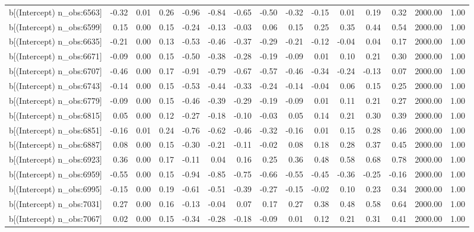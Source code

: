 \begin{table}[ht]
\begin{tabular}{rrrrrrrrrrrrrrr}
  b[(Intercept) n\_obs:6563] & -0.32 & 0.01 & 0.26 & -0.96 & -0.84 & -0.65 & -0.50 & -0.32 & -0.15 & 0.01 & 0.19 & 0.32 & 2000.00 & 1.00 \\ 
  b[(Intercept) n\_obs:6599] & 0.15 & 0.00 & 0.15 & -0.24 & -0.13 & -0.03 & 0.06 & 0.15 & 0.25 & 0.35 & 0.44 & 0.54 & 2000.00 & 1.00 \\ 
  b[(Intercept) n\_obs:6635] & -0.21 & 0.00 & 0.13 & -0.53 & -0.46 & -0.37 & -0.29 & -0.21 & -0.12 & -0.04 & 0.04 & 0.17 & 2000.00 & 1.00 \\ 
  b[(Intercept) n\_obs:6671] & -0.09 & 0.00 & 0.15 & -0.50 & -0.38 & -0.28 & -0.19 & -0.09 & 0.01 & 0.10 & 0.21 & 0.30 & 2000.00 & 1.00 \\ 
  b[(Intercept) n\_obs:6707] & -0.46 & 0.00 & 0.17 & -0.91 & -0.79 & -0.67 & -0.57 & -0.46 & -0.34 & -0.24 & -0.13 & 0.07 & 2000.00 & 1.00 \\ 
  b[(Intercept) n\_obs:6743] & -0.14 & 0.00 & 0.15 & -0.53 & -0.44 & -0.33 & -0.24 & -0.14 & -0.04 & 0.06 & 0.15 & 0.25 & 2000.00 & 1.00 \\ 
  b[(Intercept) n\_obs:6779] & -0.09 & 0.00 & 0.15 & -0.46 & -0.39 & -0.29 & -0.19 & -0.09 & 0.01 & 0.11 & 0.21 & 0.27 & 2000.00 & 1.00 \\ 
  b[(Intercept) n\_obs:6815] & 0.05 & 0.00 & 0.12 & -0.27 & -0.18 & -0.10 & -0.03 & 0.05 & 0.14 & 0.21 & 0.30 & 0.39 & 2000.00 & 1.00 \\ 
  b[(Intercept) n\_obs:6851] & -0.16 & 0.01 & 0.24 & -0.76 & -0.62 & -0.46 & -0.32 & -0.16 & 0.01 & 0.15 & 0.28 & 0.46 & 2000.00 & 1.00 \\ 
  b[(Intercept) n\_obs:6887] & 0.08 & 0.00 & 0.15 & -0.30 & -0.21 & -0.11 & -0.02 & 0.08 & 0.18 & 0.28 & 0.37 & 0.45 & 2000.00 & 1.00 \\ 
  b[(Intercept) n\_obs:6923] & 0.36 & 0.00 & 0.17 & -0.11 & 0.04 & 0.16 & 0.25 & 0.36 & 0.48 & 0.58 & 0.68 & 0.78 & 2000.00 & 1.00 \\ 
  b[(Intercept) n\_obs:6959] & -0.55 & 0.00 & 0.15 & -0.94 & -0.85 & -0.75 & -0.66 & -0.55 & -0.45 & -0.36 & -0.25 & -0.16 & 2000.00 & 1.00 \\ 
  b[(Intercept) n\_obs:6995] & -0.15 & 0.00 & 0.19 & -0.61 & -0.51 & -0.39 & -0.27 & -0.15 & -0.02 & 0.10 & 0.23 & 0.34 & 2000.00 & 1.00 \\ 
  b[(Intercept) n\_obs:7031] & 0.27 & 0.00 & 0.16 & -0.13 & -0.04 & 0.07 & 0.17 & 0.27 & 0.38 & 0.48 & 0.58 & 0.64 & 2000.00 & 1.00 \\ 
  b[(Intercept) n\_obs:7067] & 0.02 & 0.00 & 0.15 & -0.34 & -0.28 & -0.18 & -0.09 & 0.01 & 0.12 & 0.21 & 0.31 & 0.41 & 2000.00 & 1.00 \\ 

\end{tabular}
\end{table}
